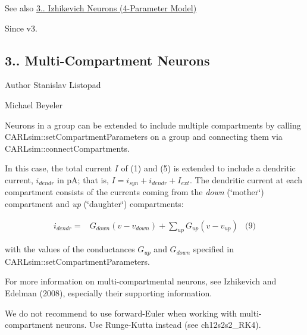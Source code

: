 \begin{DoxySeeAlso}{See also}
\hyperlink{ch3_neurons_synapses_groups_ch3s1s1_izhikevich_neurons4}{3.. Izhikevich Neurons (4-\/\+Parameter Model)} 
\end{DoxySeeAlso}
\begin{DoxySince}{Since}
v3.
\end{DoxySince}
\hypertarget{ch3_neurons_synapses_groups_ch3s1s3_compartments}{}\subsection{3.. Multi-\/\+Compartment Neurons}\label{ch3_neurons_synapses_groups_ch3s1s3_compartments}
\begin{DoxyAuthor}{Author}
Stanislav Listopad 

Michael Beyeler
\end{DoxyAuthor}
Neurons in a group can be extended to include multiple compartments by calling C\+A\+R\+Lsim\+::set\+Compartment\+Parameters on a group and connecting them via C\+A\+R\+Lsim\+::connect\+Compartments.

In this case, the total current $I$ of (1) and (5) is extended to include a dendritic current, $i_{dendr}$ in pA; that is, $I = i_{syn} + i_{dendr} + I_{ext}$. The dendritic current at each compartment consists of the currents coming from the {\itshape down} (\char`\"{}mother\char`\"{}) compartment and {\itshape up} (\char`\"{}daughter\char`\"{}) compartments\+:

\begin{align*} i_{dendr} = & G_{down} (v - v_{down}) + \sum \limits_{up} G_{up} (v - v_{up}) & \text{(9)} \end{align*}

with the values of the conductances $G_{up}$ and $G_{down}$ specified in C\+A\+R\+Lsim\+::set\+Compartment\+Parameters.

For more information on multi-\/compartmental neurons, see Izhikevich and Edelman (2008), especially their supporting information.

We do not recommend to use forward-\/\+Euler when working with multi-\/compartment neurons. Use Runge-\/\+Kutta instead (see ch12s2s2\+\_\+\+R\+K4).

